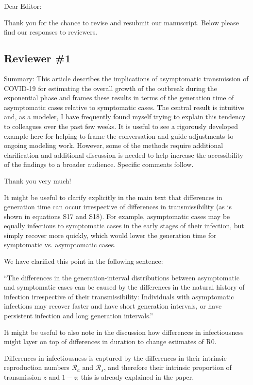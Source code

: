 \documentclass[12pt]{article}
\newcommand{\rev}{\subsection*}
\newcommand{\revtext}{\textsf}
\begin{document}
\noindent Dear Editor:

Thank you for the chance to revise and resubmit our manuscript. 
Below please find our responses to reviewers.

\rev{Reviewer \#1}

\revtext{Summary: This article describes the implications of asymptomatic transmission of COVID-19 for estimating the overall growth of the outbreak during the exponential phase and frames these results in terms of the generation time of asymptomatic cases relative to symptomatic cases.  The central result is intuitive and, as a modeler, I have frequently found myself trying to explain this tendency to colleagues over the past few weeks.  It is useful to see a rigorously developed example here for helping to frame the conversation and guide adjustments to ongoing modeling work.  However, some of the methods require additional clarification and additional discussion is needed to help increase the accessibility of the findings to a broader audience. Specific comments follow.}

Thank you very much!

\revtext{It might be useful to clarify explicitly in the main text that differences in generation time can occur irrespective of differences in transmissibility (as is shown in equations S17 and S18).  For example, asymptomatic cases may be equally infectious to symptomatic cases in the early stages of their infection, but simply recover more quickly, which would lower the generation time for symptomatic vs. asymptomatic cases.}  

We have clarified this point in the following sentence:

``The differences in the generation-interval distributions between asymptomatic and symptomatic cases can be caused by the differences in the natural history of infection irrespective of their transmissibility:
Individuals with asymptomatic infections may recover faster and have short generation intervals, or have persistent infection and long generation intervals.''

\revtext{It might be useful to also note in the discussion how differences in infectiousness might layer on top of differences in duration to change estimates of R0.} 

Differences in infectiousness is captured by the differences in their intrinsic reproduction numbers $\mathcal R_a$ and $\mathcal R_s$, and therefore their intrinsic proportion of transmission $z$ and $1-z$; this is already explained in the paper.
\end{document}

